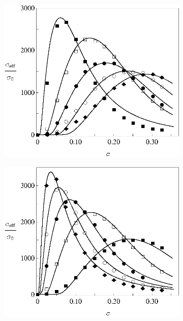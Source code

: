 \documentclass[14pt,twoside]{vakthesis}
\begin{document}
\begin{figure}[tb]
	\centering
	\begin{subfigure}[c]{0.48\textwidth}
		\includegraphics[width=\textwidth]{Siekierski_t_fixed.eps}
		\caption{} \label{fig:simulations-sigma-Glayer2006-a}
	\end{subfigure}
	\quad
	\begin{subfigure}[c]{0.48\textwidth}
		\includegraphics[width=\textwidth]{Siekierski_d_fixed.eps}
		\caption{} \label{fig:simulations-sigma-Glayer2006-b}

\end{subfigure}
\end{figure}
\end{document}
